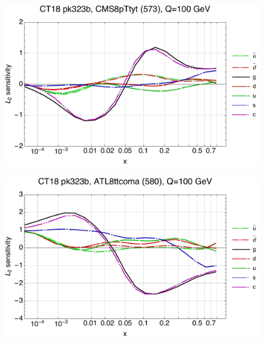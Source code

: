 \documentclass[10pt,aps,prd,floatfix,titlepage]{revtex4}
\begin{document}
\clearpage
\begin{figure}
\includegraphics[width=\textwidth,height=0.44\textheight,keepaspectratio]{1/573_ct18nn_L2_q100_Sf_1.pdf}
\caption{}
\end{figure}
\begin{figure}
\includegraphics[width=\textwidth,height=0.44\textheight,keepaspectratio]{1/580_ct18nn_L2_q100_Sf_1.pdf}
\caption{}
\end{figure}
\clearpage
\end{document}
